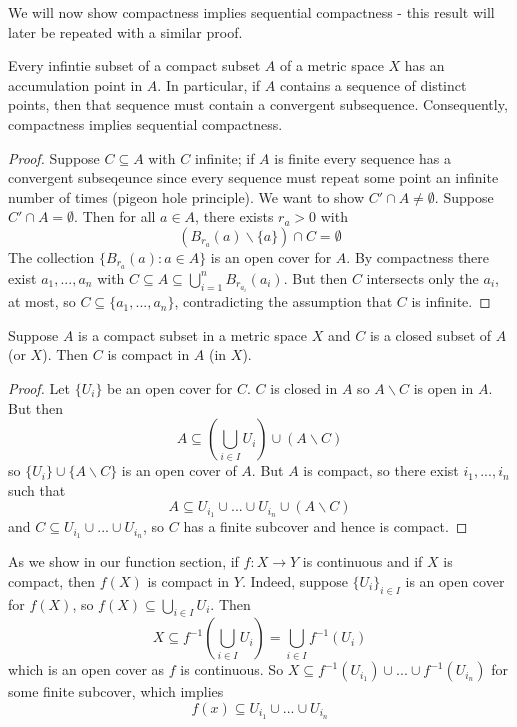 We will now show compactness implies sequential compactness - this result will later be repeated with a similar proof.

\begin{prop}
    Every infintie subset of a compact subset $A$ of a metric space $X$ has an accumulation point in $A$. In particular, if $A$ contains a sequence of distinct points, then that sequence must contain a convergent subsequence. Consequently, compactness implies sequential compactness.
\end{prop}
\begin{proof}
    Suppose $C \subseteq A$ with $C$ infinite; if $A$ is finite every sequence has a convergent subseqeunce since every sequence must repeat some point an infinite number of times (pigeon hole principle). We want to show $C'\cap A \neq \emptyset$. Suppose $C'\cap A = \emptyset$. Then for all $a \in A$, there exists $r_a > 0$ with $$(B_{r_a}(a)\backslash\{a\})\cap C = \emptyset$$ The collection $\{B_{r_a}(a):a \in A\}$ is an open cover for $A$. By compactness there exist $a_1,...,a_n$ with $C \subseteq A \subseteq \bigcup_{i=1}^nB_{r_{a_i}}(a_i)$. But then $C$ intersects only the $a_i$, at most, so $C \subseteq \{a_1,...,a_n\}$, contradicting the assumption that $C$ is infinite.
\end{proof}

\begin{prop}
    Suppose $A$ is a compact subset in a metric space $X$ and $C$ is a closed subset of $A$ (or $X$). Then $C$ is compact in $A$ (in $X$).
\end{prop}
\begin{proof}
    Let $\{U_i\}$ be an open cover for $C$. $C$ is closed in $A$ so $A \backslash C$ is open in $A$. But then $$A \subseteq \left(\bigcup_{i \in I}U_i\right)\cup\left(A\backslash C\right)$$ so $\{U_i\}\cup\{A\backslash C\}$ is an open cover of $A$. But $A$ is compact, so there exist $i_1,...,i_n$ such that $$A \subseteq U_{i_1}\cup...\cup U_{i_n}\cup(A\backslash C)$$ and $C \subseteq U_{i_1}\cup ... \cup U_{i_n}$, so $C$ has a finite subcover and hence is compact.
\end{proof}

\begin{eg}
    As we show in our function section, if $f:X\rightarrow Y$ is continuous and if $X$ is compact, then $f(X)$ is compact in $Y$. Indeed, suppose $\{U_i\}_{i \in I}$ is an open cover for $f(X)$, so $f(X) \subseteq \bigcup_{i \in I}U_i$. Then $$X \subseteq f^{-1}\left(\bigcup_{i \in I}U_i\right) = \bigcup_{i \in I}f^{-1}(U_i)$$ which is an open cover as $f$ is continuous. So $X \subseteq f^{-1}(U_{i_1})\cup...\cup f^{-1}(U_{i_n})$ for some finite subcover, which implies $$f(x) \subseteq U_{i_1}\cup...\cup U_{i_n}$$
\end{eg}

